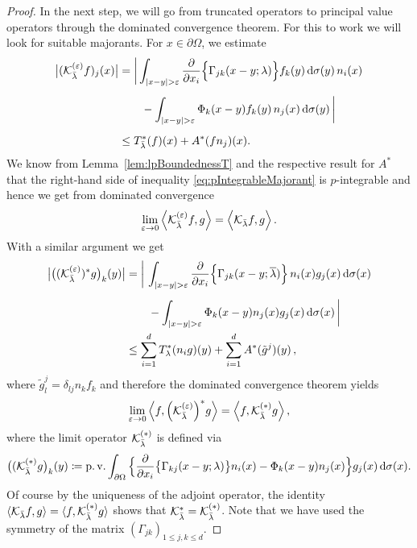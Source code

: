 \begin{proof}
  In the next step, we will go from truncated operators to principal value operators through the dominated convergence theorem. 
  For this to work we will look for suitable majorants.
  For $x \in \partial\Omega$, we estimate
  \begin{align}
    \big|(\mathcal{K}_{\bar\lambda}^{(\varepsilon)}f)_j (x)\big|
    &= \bigg| \int_{|x - y| > \varepsilon} \frac{\partial}{\partial x_i} \Big\{ \Gamma_{jk}(x - y; \lambda) \Big\} f_k(y) \, {\operatorname{d}\!{\sigma}}(y) \, n_i(x)  \nonumber\\[0.5em]
    &\qquad - \int_{|x - y| > \varepsilon} \Phi_k(x - y) f_k(y)\, n_j(x) \, {\operatorname{d}\!{\sigma}}(y)\, \bigg| \nonumber\\[0.5em]
    \label{eq:pIntegrableMajorant}
    &\leq T_{\bar\lambda}^*(f)(x) + A^*(fn_j)(x).
  \end{align}
  We know from Lemma~\ref{lem:lpBoundednessT} and the respective result for $A^*$ that the right-hand side of inequality \eqref{eq:pIntegrableMajorant} is $p$-integrable and hence we get from dominated convergence
  \begin{align*}
    \lim_{\varepsilon \to 0} \Big\langle \mathcal{K}_{\bar\lambda}^{(\varepsilon)} f, g \Big\rangle = \Big\langle \mathcal{K}_{\bar\lambda} f, g \Big\rangle\,.
  \end{align*}
  With a similar argument we get
  \begin{align*}
    \big| \big((\mathcal{K}_{\bar \lambda}^{(\varepsilon)})^* g \big)_k(y) \big|
    &=
    \bigg|\, \int_{|x - y| > \varepsilon} \frac{\partial}{\partial x_i} \Big\{ \Gamma_{jk}(x - y; \overline\lambda) \Big\} \, n_i(x) g_j(x) \, {\operatorname{d}\!{\sigma}}(x)\\[0.5em]
    &\qquad - \int_{|x - y| > \varepsilon} \Phi_k(x - y) n_j(x) g_j(x)   \, {\operatorname{d}\!{\sigma}}(x) \,\bigg| \\
    &\leq \sum_{i = 1}^d T_\lambda^*(n_i g)(y)  + \sum_{i = 1}^d A^*(\tilde g^j)(y)\,,
  \end{align*}
  where $\tilde g^j_l = \delta_{lj} n_k f_k$ and therefore the dominated convergence theorem yields
  \begin{align*}
    \lim_{\varepsilon \to 0} \Big\langle f, {\Big(\mathcal{K}_{\bar\lambda}^{(\varepsilon)}}\Big)^* g \Big\rangle = \Big\langle f,\mathcal{K}_{\bar\lambda}^{(*)}  g \Big\rangle\,,
  \end{align*}
  where the limit operator $\mathcal{K}_{\bar\lambda}^{(*)}$ is defined via
  \begin{align*}
    \big( ( \mathcal{K}_{\bar\lambda}^{(*)} g\big)_k(y)
    \coloneqq \operatorname{p. v.}\int_{\partial\Omega} \Big\{ \frac{\partial}{\partial x_i} \big\{ \Gamma_{kj}(x - y; \lambda)\big\} n_i(x) - \Phi_k(x - y) n_j(x) \Big\} g_j(x) \, {\operatorname{d}\!{\sigma}}(x). 
  \end{align*}
  Of course by the uniqueness of the adjoint operator, the identity $\langle \mathcal{K}_{\bar\lambda} f, g \rangle = \langle f, \mathcal{K}_{\bar\lambda}^{(*)} g \rangle$ shows that $\mathcal{K}_{\bar\lambda}^* = \mathcal{K}_{\bar\lambda}^{(*)}$.
  Note that we have used the symmetry of the matrix $(\Gamma_{jk})_{1 \leq j,k \leq d}$.


\end{proof}
